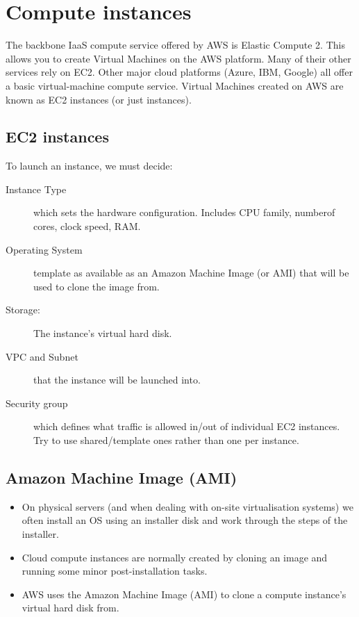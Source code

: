 \section{Compute instances}
\label{sec:compute-instances}

The backbone IaaS compute service offered by AWS is Elastic Compute 2.
This allows you to create Virtual Machines on the AWS platform.
Many of their other services rely on EC2.
Other major cloud platforms (Azure, IBM, Google) all offer a basic virtual-machine compute service.
Virtual Machines created on AWS are known as EC2 instances (or just instances).

\subsection{EC2 instances}
\label{sec:ec2-instances}

To launch an instance, we must decide:

\begin{description}
\item[Instance Type]
  which sets the hardware configuration.
  Includes CPU family, numberof cores, clock speed, RAM.
\item[Operating System]
  template as available as an Amazon Machine Image (or AMI) that will be used to clone the image from.
\item[Storage:]
  The instance's virtual hard disk.
\item[VPC and Subnet]
  that the instance will be launched into.
\item[Security group]
  which defines what traffic is allowed in/out of individual EC2
  instances.
  Try to use shared/template ones rather than one per instance.
\end{description}

\subsection{Amazon Machine Image (AMI)}
\label{sec:amazon-machine-image-ami}

\begin{itemize}
\item
  On physical servers (and when dealing with on-site virtualisation
  systems) we often install an OS using an installer disk and work
  through the steps of the installer.
\item
  Cloud compute instances are normally created by cloning an image and
  running some minor post-installation tasks.
\item
  AWS uses the Amazon Machine Image (AMI) to clone a compute instance's
  virtual hard disk from.
\end{itemize}

